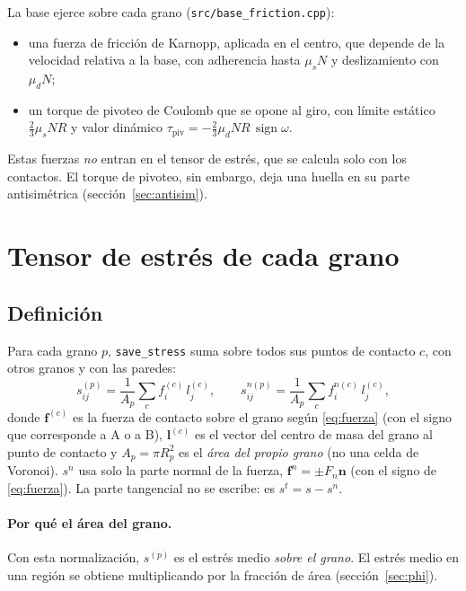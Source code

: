 \documentclass[11pt,a4paper]{article}
\newcommand{\vect}[1]{\mathbf{#1}}
\newcommand{\n}{\vect{n}}
\newcommand{\lv}{\vect{l}}
\newcommand{\f}{\vect{f}}
\newcommand{\code}[1]{\texttt{#1}}
\begin{document}
La base ejerce sobre cada grano (\code{src/base\_friction.cpp}):
\begin{itemize}
  \item una fuerza de fricción de Karnopp, aplicada en el centro, que
    depende de la velocidad relativa a la base, con adherencia hasta
    $\mu_s N$ y deslizamiento con $\mu_d N$;
  \item un torque de pivoteo de Coulomb que se opone al giro, con límite
    estático $\frac{2}{3} \mu_s N R$ y valor dinámico
    $\tau_\text{piv} = -\frac{2}{3} \mu_d N R \, \operatorname{sign}\omega$.
\end{itemize}
Estas fuerzas \emph{no} entran en el tensor de estrés, que se calcula solo
con los contactos. El torque de pivoteo, sin embargo, deja una huella en
su parte antisimétrica (sección~\ref{sec:antisim}).

\section{Tensor de estrés de cada grano}
\label{sec:grano}

\subsection{Definición}

Para cada grano $p$, \code{save\_stress} suma sobre todos sus puntos de
contacto $c$, con otros granos y con las paredes:
\begin{equation}
  s^{(p)}_{ij} = \frac{1}{A_p} \sum_{c} f^{(c)}_i \, l^{(c)}_j ,
  \qquad
  s^{n(p)}_{ij} = \frac{1}{A_p} \sum_{c} f^{n(c)}_i \, l^{(c)}_j ,
  \label{eq:love}
\end{equation}
donde $\f^{(c)}$ es la fuerza de contacto sobre el grano según
\eqref{eq:fuerza} (con el signo que corresponde a A o a B), $\lv^{(c)}$
es el vector del centro de masa del grano al punto de contacto y
$A_p = \pi R_p^2$ es el \emph{área del propio grano} (no una celda de
Voronoi). $s^n$ usa solo la parte normal de la fuerza,
$\f^{n} = \pm F_n \n$ (con el signo de \eqref{eq:fuerza}). La parte tangencial no se escribe: es $s^t = s - s^n$.

\paragraph{Por qué el área del grano.} Con esta normalización, $s^{(p)}$
es el estrés medio \emph{sobre el grano}. El estrés medio en una región
se obtiene multiplicando por la fracción de área (sección~\ref{sec:phi}).
\end{document}

